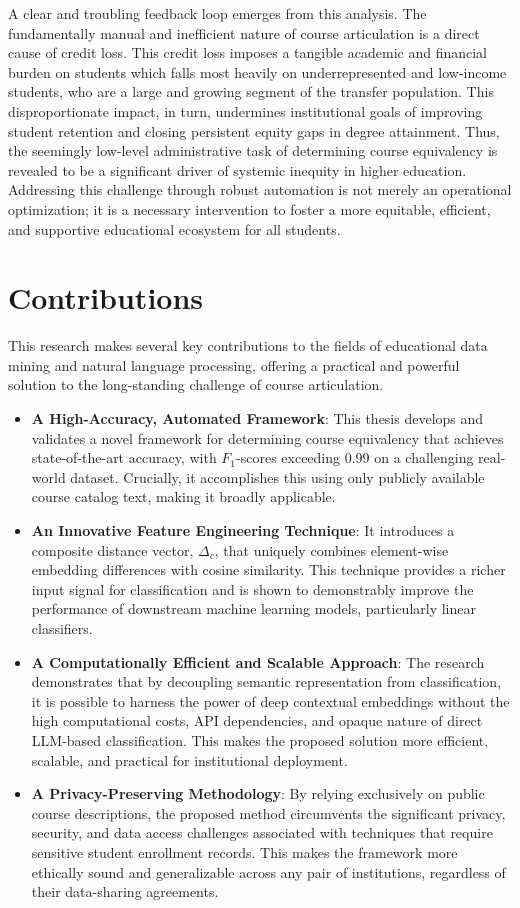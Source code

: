 A clear and troubling feedback loop emerges from this analysis. The fundamentally manual and inefficient nature of course articulation is a direct cause of credit loss. This credit loss imposes a tangible academic and financial burden on students which falls most heavily on underrepresented and low-income students, who are a large and growing segment of the transfer population. This disproportionate impact, in turn, undermines institutional goals of improving student retention and closing persistent equity gaps in degree attainment. Thus, the seemingly low-level administrative task of determining course equivalency is revealed to be a significant driver of systemic inequity in higher education. Addressing this challenge through robust automation is not merely an operational optimization; it is a necessary intervention to foster a more equitable, efficient, and supportive educational ecosystem for all students.

\section{Contributions}
This research makes several key contributions to the fields of educational data mining and natural language processing, offering a practical and powerful solution to the long-standing challenge of course articulation.
\begin{itemize}
\item \textbf{A High-Accuracy, Automated Framework}: This thesis develops and validates a novel framework for determining course equivalency that achieves state-of-the-art accuracy, with \(F_1\)-scores exceeding 0.99 on a challenging real-world dataset. Crucially, it accomplishes this using only publicly available course catalog text, making it broadly applicable.
\item \textbf{An Innovative Feature Engineering Technique}: It introduces a composite distance vector, \(\Delta_c\), that uniquely combines element-wise embedding differences with cosine similarity. This technique provides a richer input signal for classification and is shown to demonstrably improve the performance of downstream machine learning models, particularly linear classifiers.
\item \textbf{A Computationally Efficient and Scalable Approach}: The research demonstrates that by decoupling semantic representation from classification, it is possible to harness the power of deep contextual embeddings without the high computational costs, API dependencies, and opaque nature of direct LLM-based classification. This makes the proposed solution more efficient, scalable, and practical for institutional deployment.
\item \textbf{A Privacy-Preserving Methodology}: By relying exclusively on public course descriptions, the proposed method circumvents the significant privacy, security, and data access challenges associated with techniques that require sensitive student enrollment records. This makes the framework more ethically sound and generalizable across any pair of institutions, regardless of their data-sharing agreements.
\end{itemize}

